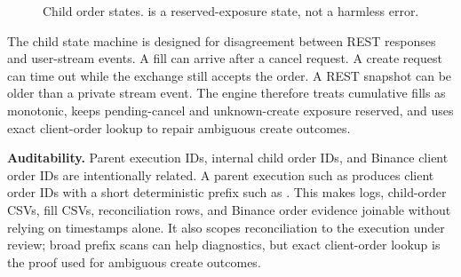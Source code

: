\begin{figure}[t]
\centering
{}
\caption{Child order states.  is a reserved-exposure state, not a harmless error.}
\label{fig:child-state}
\end{figure}

The child state machine is designed for disagreement between REST responses and user-stream events. A fill can arrive after a cancel request. A create request can time out while the exchange still accepts the order. A REST snapshot can be older than a private stream event. The engine therefore treats cumulative fills as monotonic, keeps pending-cancel and unknown-create exposure reserved, and uses exact client-order lookup to repair ambiguous create outcomes.

\textbf{Auditability.} Parent execution IDs, internal child order IDs, and Binance client order IDs are intentionally related. A parent execution such as  produces client order IDs with a short deterministic prefix such as . This makes logs, child-order CSVs, fill CSVs, reconciliation rows, and Binance order evidence joinable without relying on timestamps alone. It also scopes reconciliation to the execution under review; broad prefix scans can help diagnostics, but exact client-order lookup is the proof used for ambiguous create outcomes.
